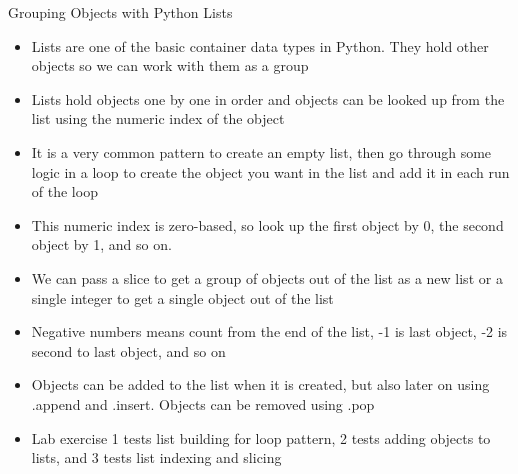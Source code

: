 \documentclass[]{article}
\begin{document}
\begin{section}{Grouping Objects with Python Lists}
\begin{itemize}
\item Lists are one of the basic container data types in Python. They hold other objects so we can work with them as a group
\item Lists hold objects one by one in order and objects can be looked up from the list using the numeric index of the object
\item It is a very common pattern to create an empty list, then go through some logic in a loop to create the object you want in the list and add it in each run of the loop
\item This numeric index is zero-based, so look up the first object by 0, the second object by 1, and so on.
\item We can pass a slice to get a group of objects out of the list as a new list or a single integer to get a single object out of the list
\item Negative numbers means count from the end of the list, -1 is last object, -2 is second to last object, and so on
\item Objects can be added to the list when it is created, but also later on using .append and .insert. Objects can be removed using .pop
\item Lab exercise 1 tests list building for loop pattern, 2 tests adding objects to lists, and 3 tests list indexing and slicing
\end{itemize}
\end{section}
\end{document}
